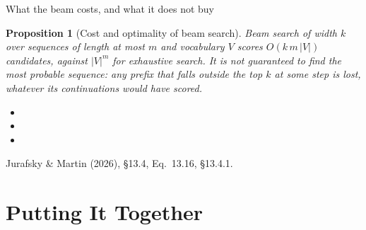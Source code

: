 \documentclass[aspectratio=169, 11pt]{beamer}
\newtheorem{propx}[theorem]{Proposition}
\newcommand{\srcline}[1]{%
  \par\vspace{0.25em}%
  {\scriptsize\color{mcMuted}\hfill #1\par}}
\newcommand{\src}[3]{}      %
\begin{document}
\begin{frame}{What the beam costs, and what it does not buy}
  \src{jurafsky_slp3}{equation}{13.16}
  \src{jurafsky_slp3}{section}{13.4}
  \src{jurafsky_slp3}{section}{13.4.1}
  \vspace{-0.3em}
  \begin{propx}[Cost and optimality of beam search]\label{th:beamcost}
    \small
    Beam search of width $k$ over sequences of length at most $m$ and
    vocabulary $V$ scores $O(k\,m\,|V|)$ candidates, against $|V|^m$
    for exhaustive search. It is not guaranteed to find the most
    probable sequence: any prefix that falls outside the top $k$ at
    some step is lost, whatever its continuations would have scored.
  \end{propx}
  \vspace{0.05em}
  {\footnotesize
  \begin{itemize}\itemsep0.22em
    \item {}
    \item {}
    \item {}
  \end{itemize}}
  \vspace{-0.3em}
  \srcline{Jurafsky \& Martin (2026), \S13.4, Eq.~13.16, \S13.4.1.}
\end{frame}

\section{Putting It Together}
\end{document}
